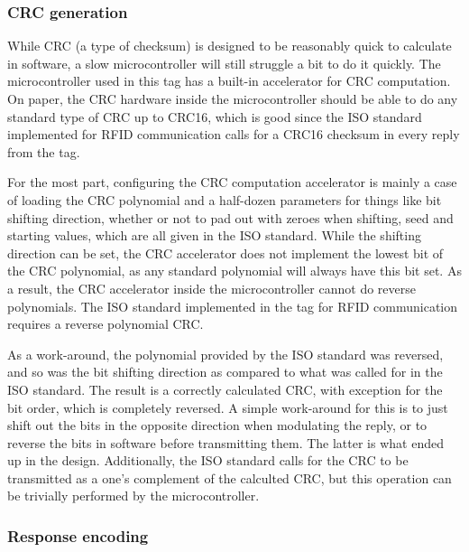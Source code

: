 \subsubsection{CRC generation}
While CRC (a type of checksum) is designed to be reasonably quick to calculate in software,
a slow microcontroller will still struggle a bit to do it quickly. The microcontroller used in this
tag has a built-in accelerator for CRC computation. On paper, the CRC hardware inside the microcontroller
should be able to do any standard type of CRC up to CRC16, which is good since the ISO standard
implemented for RFID communication calls for a CRC16 checksum in every reply from the tag.

For the most part, configuring the CRC computation accelerator is mainly a case of loading the
CRC polynomial and a half-dozen parameters for things like bit shifting direction, whether or not to pad
out with zeroes when shifting, seed and starting values, which are all given in the ISO standard.
While the shifting direction can be set, the CRC
accelerator does not implement the lowest bit of the CRC polynomial, as any standard polynomial will always have
this bit set. As a result, the CRC accelerator inside the microcontroller cannot do reverse polynomials.
The ISO standard implemented in the tag for RFID communication requires a reverse polynomial CRC.

As a work-around, the polynomial provided by the ISO standard was reversed, and so was the bit shifting
direction as compared to what was called for in the ISO standard. The result is a correctly calculated
CRC, with exception for the bit order, which is completely reversed. A simple work-around for this is to
just shift out the bits in the opposite direction when modulating the reply, or to reverse the bits
in software before transmitting them. The latter is what ended up in the design. Additionally, the ISO standard
calls for the CRC to be transmitted as a one's complement of the calculted CRC, but this operation
can be trivially performed by the microcontroller.


\subsubsection{Response encoding}
